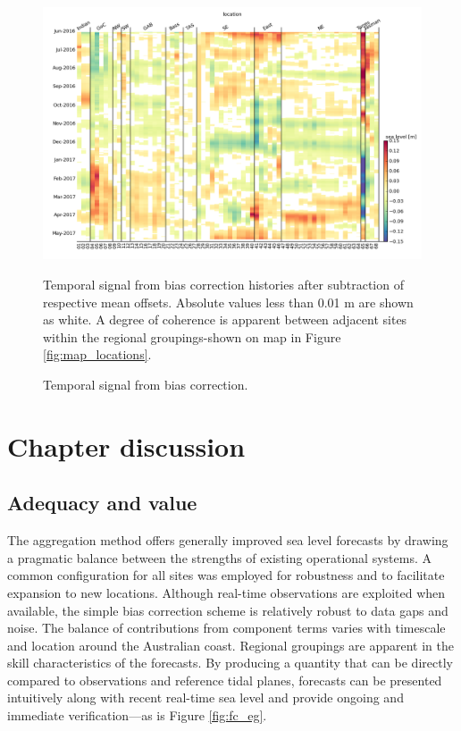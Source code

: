 \begin{figure}[H]
\centering
\includegraphics[width=1.0\textwidth]{figures/plots/aggSL_bias_breakdown_plot_2.png}
\caption{Temporal signal from bias correction.}{Temporal signal from bias correction histories after subtraction of respective mean offsets.  Absolute values less than 0.01 m are shown as white.  A degree of coherence is apparent between adjacent sites within the regional groupings-shown on map in Figure \ref{fig:map_locations}. } 
\label{fig:bias_time}
\end{figure}  


\section{Chapter discussion}
\subsection{Adequacy and value}
The aggregation method offers generally improved sea level forecasts by drawing a pragmatic balance between the strengths of existing operational systems.
A common configuration for all sites was employed for robustness and to facilitate expansion to new locations.  
Although real-time observations are exploited when available, the simple bias correction scheme is relatively robust to data gaps and noise. 
The balance of contributions from component terms varies with timescale and location around the Australian coast.
Regional groupings are apparent in the skill characteristics of the forecasts.
By producing a quantity that can be directly compared to observations and reference tidal planes, forecasts can be presented intuitively along with recent real-time sea level and provide ongoing and immediate verification---as is Figure \ref{fig:fc_eg}.

